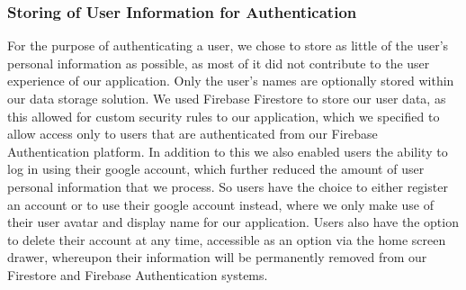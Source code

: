\documentclass[a4paper, 11pt]{article}
\begin{document}
      \subsubsection{Storing of User Information for Authentication}
      For the purpose of authenticating a user, we chose to store as little of
      the user's personal information as possible, as most of it did not
      contribute to the user experience of our application. Only the user's
      names are optionally stored within our data storage solution.
      \newline\newline
      We used Firebase Firestore to store our user data, as this allowed for
      custom security rules to our application, which we specified to allow
      access only to users that are authenticated from our Firebase
      Authentication platform\cite{firebase-doc-auth}. In addition to this we
      also enabled users the ability to log in using their google account, which
      further reduced the amount of user personal information that we process.
      So users have the choice to either register an account or to use their
      google account instead, where we only make use of their user avatar and
      display name for our application.
      \newline\newline
      Users also have the option to delete their account at any time, accessible
      as an option via the home screen drawer, whereupon their information will
      be permanently removed from our Firestore and Firebase Authentication
      systems.
\end{document}
